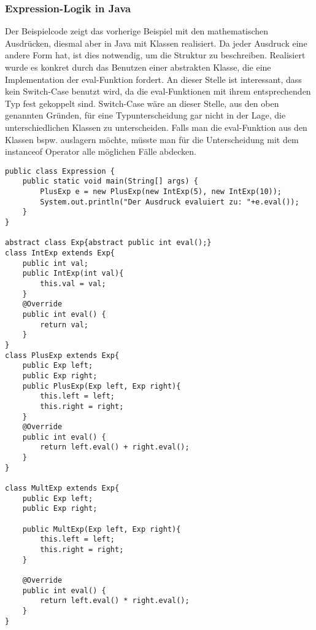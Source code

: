 \documentclass[a4paper, 1ppt]{article}
\begin{document}
\subsubsection{Expression-Logik in Java}
Der Beispielcode zeigt das vorherige Beispiel mit den mathematischen Ausdrücken, diesmal aber in Java mit Klassen realisiert. Da jeder Ausdruck eine andere Form hat, ist dies notwendig, um die Struktur zu beschreiben.
Realisiert wurde es konkret durch das Benutzen einer abstrakten Klasse, die eine Implementation der eval-Funktion fordert.
An dieser Stelle ist interessant, dass kein Switch-Case benutzt wird, da die eval-Funktionen mit ihrem entsprechenden Typ fest gekoppelt sind.
Switch-Case wäre an dieser Stelle, aus den oben genannten Gründen, für eine Typunterscheidung gar nicht in der Lage, die unterschiedlichen Klassen zu unterscheiden. 
Falls man die eval-Funktion aus den Klassen bspw. auslagern möchte, müsste man für die Unterscheidung mit dem instanceof Operator alle möglichen Fälle abdecken.
\begin{verbatim}
public class Expression {
    public static void main(String[] args) {
        PlusExp e = new PlusExp(new IntExp(5), new IntExp(10));
        System.out.println("Der Ausdruck evaluiert zu: "+e.eval());
    }
}

abstract class Exp{abstract public int eval();}
class IntExp extends Exp{
    public int val;
    public IntExp(int val){
        this.val = val;
    }
    @Override
    public int eval() {
        return val;
    }
}
class PlusExp extends Exp{
    public Exp left;
    public Exp right;
    public PlusExp(Exp left, Exp right){
        this.left = left;
        this.right = right;
    }
    @Override
    public int eval() {
        return left.eval() + right.eval();
    }
}

class MultExp extends Exp{
    public Exp left;
    public Exp right;

    public MultExp(Exp left, Exp right){
        this.left = left;
        this.right = right;
    }

    @Override
    public int eval() {
        return left.eval() * right.eval();
    }
}
\end{verbatim}
\end{document}

